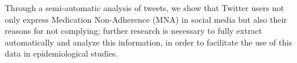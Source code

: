 Through a semi-automatic analysis of tweets, we show that Twitter users not only express Medication Non-Adherence (MNA) in social media but also their reasons for not complying; further research is necessary to fully extract automatically and analyze this information, in order to facilitate the use of this data in epidemiological studies.
